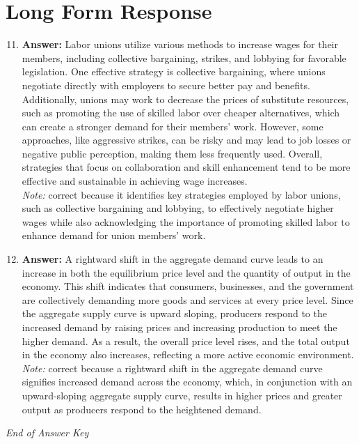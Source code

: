 \documentclass[12pt]{article}
\begin{document}
\section*{Long Form Response}
\begin{enumerate}[label=\arabic*.]
\setcounter{enumi}{10}
\item \textbf{Answer:} Labor unions utilize various methods to increase wages for their members, including collective bargaining, strikes, and lobbying for favorable legislation. One effective strategy is collective bargaining, where unions negotiate directly with employers to secure better pay and benefits. Additionally, unions may work to decrease the prices of substitute resources, such as promoting the use of skilled labor over cheaper alternatives, which can create a stronger demand for their members' work. However, some approaches, like aggressive strikes, can be risky and may lead to job losses or negative public perception, making them less frequently used. Overall, strategies that focus on collaboration and skill enhancement tend to be more effective and sustainable in achieving wage increases.
\\ \textit{Note:} correct because it identifies key strategies employed by labor unions, such as collective bargaining and lobbying, to effectively negotiate higher wages while also acknowledging the importance of promoting skilled labor to enhance demand for union members' work.
\item \textbf{Answer:} A rightward shift in the aggregate demand curve leads to an increase in both the equilibrium price level and the quantity of output in the economy. This shift indicates that consumers, businesses, and the government are collectively demanding more goods and services at every price level. Since the aggregate supply curve is upward sloping, producers respond to the increased demand by raising prices and increasing production to meet the higher demand. As a result, the overall price level rises, and the total output in the economy also increases, reflecting a more active economic environment.
\\ \textit{Note:} correct because a rightward shift in the aggregate demand curve signifies increased demand across the economy, which, in conjunction with an upward-sloping aggregate supply curve, results in higher prices and greater output as producers respond to the heightened demand.
\end{enumerate}

\vfill
\noindent\textit{End of Answer Key}
\end{document}
